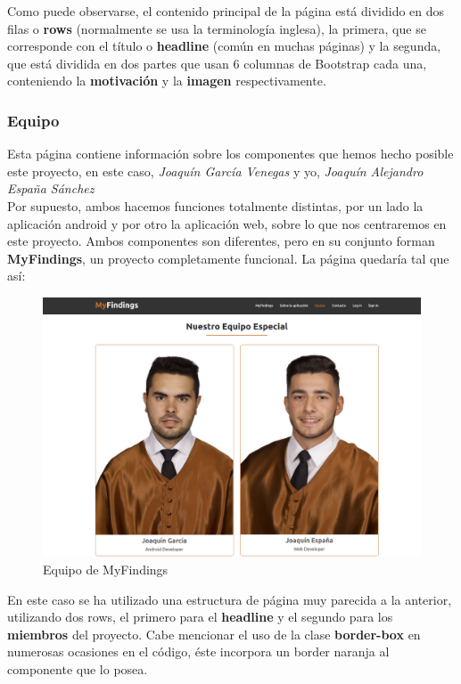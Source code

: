     Como puede observarse, el contenido principal de la página está dividido en dos filas
    o \textbf{rows} (normalmente se usa la terminología inglesa), la primera, que se
    corresponde con el título o \textbf{headline} (común en muchas páginas) y la segunda,
    que está dividida en dos partes que usan 6 columnas de Bootstrap cada una, conteniendo
    la \textbf{motivación} y la \textbf{imagen} respectivamente.

    \subsubsection{Equipo}
    Esta página contiene información sobre los componentes que hemos hecho posible este
    proyecto, en este caso, \textit{Joaquín García Venegas} y yo, \textit{Joaquín
    Alejandro España Sánchez}\\
    
    Por supuesto, ambos hacemos funciones totalmente distintas, por un lado la aplicación
    android y por otro la aplicación web, sobre lo que nos centraremos en este proyecto.
    Ambos componentes son diferentes, pero en su conjunto forman \textbf{MyFindings},
    un proyecto completamente funcional. La página quedaría tal que así:

        \begin{figure}[H]
            \centering
            \includegraphics[scale=0.25]{imagenes/team.png}
            \caption{Equipo de MyFindings}
            \label{fig:team}
        \end{figure}

    En este caso se ha utilizado una estructura de página muy parecida a la anterior, utilizando
    dos rows, el primero para el \textbf{headline} y el segundo para los \textbf{miembros} del
    proyecto. Cabe mencionar el uso de la clase \textbf{border-box} en numerosas ocasiones en 
    el código, éste incorpora un border naranja al componente que lo posea.

